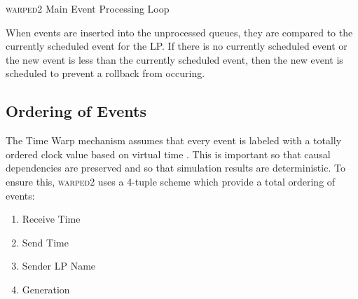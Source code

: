 \documentclass[11pt]{book}
\begin{document}
\begin{algorithm}
\DontPrintSemicolon
{}


\caption{\textsc{warped2} Main Event Processing Loop}\label{warped2_processing}
\end{algorithm}

When events are inserted into the unprocessed queues, they are compared to the currently
scheduled event for the LP.  If there is no currently scheduled event or the new event is less
than the currently scheduled event, then the new event is scheduled to prevent a rollback from
occuring.

\subsection{Ordering of Events}

The Time Warp mechanism assumes that every event is labeled with a totally ordered clock value
based on virtual time \cite{jefferson-85}.  This is important so that causal dependencies
are preserved and so that simulation results are deterministic\cite{ronngren-99}.  To ensure
this, \textsc{warped2} uses a 4-tuple scheme which provide a total ordering of events:

\begin{enumerate}
    \item Receive Time
    \item Send Time
    \item Sender LP Name
    \item Generation
\end{enumerate}
\end{document}
